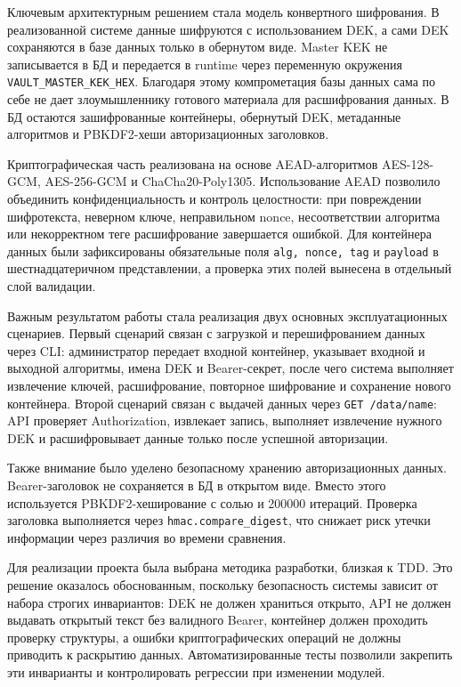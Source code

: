 \documentclass[14pt, a4paper]{extarticle}
\begin{document}
	Ключевым архитектурным решением стала модель конвертного шифрования. В реализованной системе данные шифруются с использованием DEK, а сами DEK сохраняются в базе данных только в обернутом виде. Master KEK не записывается в БД и передается в runtime через переменную окружения \texttt{VAULT\_MASTER\_KEK\_HEX}. Благодаря этому компрометация базы данных сама по себе не дает злоумышленнику готового материала для расшифрования данных. В БД остаются зашифрованные контейнеры, обернутый DEK, метаданные алгоритмов и PBKDF2-хеши авторизационных заголовков.
	
	Криптографическая часть реализована на основе AEAD-алгоритмов AES-128-GCM, AES-256-GCM и ChaCha20-Poly1305. Использование AEAD позволило объединить конфиденциальность и контроль целостности: при повреждении шифротекста, неверном ключе, неправильном nonce, несоответствии алгоритма или некорректном теге расшифрование завершается ошибкой. Для контейнера данных были зафиксированы обязательные поля \texttt{alg, nonce, tag} и \texttt{payload} в шестнадцатеричном представлении, а проверка этих полей вынесена в отдельный слой валидации.
	
	Важным результатом работы стала реализация двух основных эксплуатационных сценариев. Первый сценарий связан с загрузкой и перешифрованием данных через CLI: администратор передает входной контейнер, указывает входной и выходной алгоритмы, имена DEK и Bearer-секрет, после чего система выполняет извлечение ключей, расшифрование, повторное шифрование и сохранение нового контейнера. Второй сценарий связан с выдачей данных через \texttt{GET /data/{name}}: API проверяет Authorization, извлекает запись, выполняет извлечение нужного DEK и расшифровывает данные только после успешной авторизации.
	
	Также внимание было уделено безопасному хранению авторизационных данных. Bearer-заголовок не сохраняется в БД в открытом виде. Вместо этого используется PBKDF2-хеширование с солью и 200000 итераций. Проверка заголовка выполняется через \texttt{hmac.compare\_digest}, что снижает риск утечки информации через различия во времени сравнения.
	
	Для реализации проекта была выбрана методика разработки, близкая к TDD. Это решение оказалось обоснованным, поскольку безопасность системы зависит от набора строгих инвариантов: DEK не должен храниться открыто, API не должен выдавать открытый текст без валидного Bearer, контейнер должен проходить проверку структуры, а ошибки криптографических операций не должны приводить к раскрытию данных. Автоматизированные тесты позволили закрепить эти инварианты и контролировать регрессии при изменении модулей.
	
\end{document}

